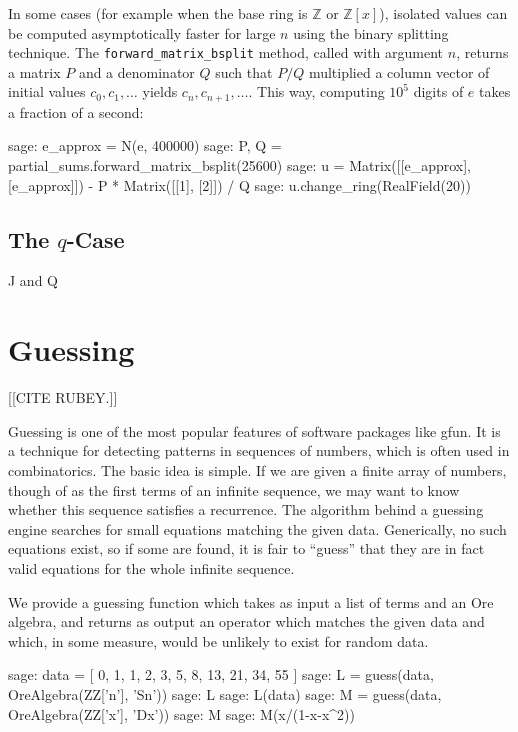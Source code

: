 \documentclass{amsart}
\begin{document}
In some cases (for example when the base ring is $\mathbb{Z}$ or
$\mathbb{Z}[x]$), isolated values can be
computed asymptotically faster for large $n$ using the binary splitting
technique.
The \verb|forward_matrix_bsplit| method, called with argument $n$,
returns a matrix $P$ and a denominator $Q$ such that $P / Q$ multiplied a
column vector of initial values $c_0, c_1, \ldots$
yields $c_n, c_{n+1}, \ldots$.
This way, computing $10^5$ digits of $e$ takes a fraction of a second:

\begin{sageexample}
  sage: e_approx = N(e, 400000)
  sage: P, Q = partial_sums.forward_matrix_bsplit(25600)
  sage: u = Matrix([[e_approx], [e_approx]]) - P * Matrix([[1], [2]]) / Q
  sage: u.change_ring(RealField(20))
\end{sageexample}




\subsection{The $q$-Case}

J and Q

\section{Guessing}\label{sec:5}

[[CITE RUBEY.]]

Guessing is one of the most popular features of software packages like gfun.  It
is a technique for detecting patterns in sequences of numbers, which is often
used in combinatorics. The basic idea is simple. If we are given a finite array
of numbers, though of as the first terms of an infinite sequence, we may want to
know whether this sequence satisfies a recurrence. The algorithm behind a
guessing engine searches for small equations matching the given data.
Generically, no such equations exist, so if some are found, it is fair to
``guess'' that they are in fact valid equations for the whole infinite sequence.

We provide a guessing function which takes as input a list of terms and an Ore
algebra, and returns as output an operator which matches the given data and
which, in some measure, would be unlikely to exist for random data.

\begin{sageexample}
  sage: data = [ 0, 1, 1, 2, 3, 5, 8, 13, 21, 34, 55 ]
  sage: L = guess(data, OreAlgebra(ZZ['n'], 'Sn'))
  sage: L
  sage: L(data)
  sage: M = guess(data, OreAlgebra(ZZ['x'], 'Dx'))
  sage: M
  sage: M(x/(1-x-x^2))
\end{sageexample}
\end{document}
